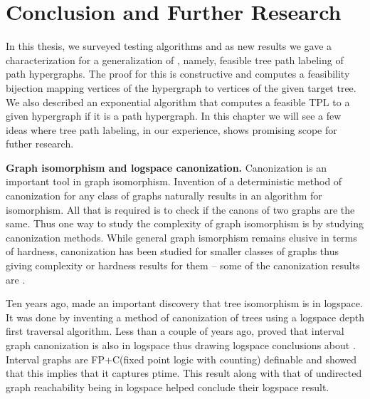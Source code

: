 \xclearpage

\def\p{{\sc P}\xspace}
\def\gicomplete{{\sc GI}-complete\xspace}
\def\logspace{{\sc logspace\xspace}\xspace}
\def\ptime{{\sc ptime}\xspace}
\def\fpplusc{{\sc FP+C}\xspace}

\chapter[Conclusion]{Conclusion and Further Research}
\label{ch:conclusion}

In this thesis, we surveyed \cop testing algorithms and as new results
we gave a characterization for a generalization of \COP, namely,
feasible tree path labeling of path hypergraphs. The proof for this is
constructive and computes a feasibility bijection mapping vertices of
the hypergraph to vertices of the given target tree. We also described
an exponential algorithm that computes a feasible TPL to a given
hypergraph if it is a path hypergraph.  In this chapter we will see a
few ideas where tree path labeling, in our experience, shows promising
scope for futher research.

\parindent 0pt

\textbf{Graph isomorphism and logspace canonization.}  Canonization is
an important tool in graph isomorphism. Invention of a deterministic
method of canonization for any class of graphs naturally results in an
algorithm for isomorphism. All that is required is to check if the
canons of two graphs are the same. Thus one way to study the
complexity of graph isomorphism is by studying canonization
methods. While general graph ismorphism remains elusive in terms of
hardness, canonization has been studied for smaller classes of graphs
thus giving complexity or hardness results for them -- some of the
canonization results are \cite{sl92,dlntw09,adkk09,kklv10}.

Ten years ago, \cite{sl92} made an important discovery that tree
isomorphism is in \logspace. It was done by inventing a method of
canonization of trees using a logspace depth first traversal
algorithm.  Less than a couple of years ago, \cite{kklv10} proved that
interval graph canonization is also in \logspace thus drawing logspace
conclusions about \COT. Interval graphs are \fpplusc (fixed point
logic with counting) definable and \cite{l10} showed that this implies
that it captures \ptime. This result along with that of undirected
graph reachability being in logspace \cite{rei08} helped \cite{kklv10}
conclude their logspace result.

